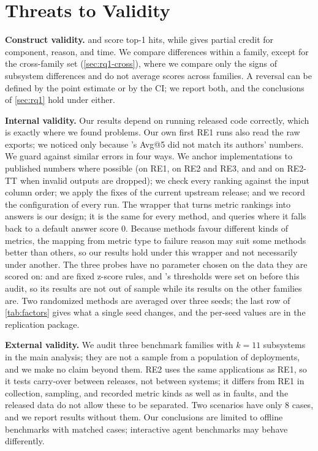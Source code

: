 \section{Threats to Validity}
\label{sec:threats}

\textbf{Construct validity.}
\rcaeval and \petshop score top-1 hits, while \openrca gives partial credit for component, reason, and time.
We compare differences within a family, except for the cross-family set (\cref{sec:rq1-cross}), where we compare only the signs of subsystem differences and do not average scores across families.
A reversal can be defined by the point estimate or by the CI; we report both, and the conclusions of \cref{sec:rq1} hold under either.

\textbf{Internal validity.}
Our results depend on running released code correctly, which is exactly where we found problems.
Our own first RE1 runs also read the raw exports; we noticed only because \baro's Avg@5 did not match its authors' numbers.
We guard against similar errors in four ways.
We anchor implementations to published numbers where possible (\baro on RE1, \simplerca on RE2 and RE3, and \tracerca and \microrank on RE2-TT when invalid outputs are dropped); we check every ranking against the input column order; we apply the fixes of the current upstream release; and we record the configuration of every run.
The \openrca wrapper that turns metric rankings into answers is our design; it is the same for every method, and queries where it falls back to a default answer score 0.
Because methods favour different kinds of metrics, the mapping from metric type to failure reason may suit some methods better than others, so our \openrca results hold under this wrapper and not necessarily under another.
The three probes have no parameter chosen on the data they are scored on: \maxz and \alertcount are fixed z-score rules, and \cdmin's thresholds were set on \openrca before this audit, so its \openrca results are not out of sample while its results on the other families are.
Two randomized methods are averaged over three seeds; the last row of \cref{tab:factors} gives what a single seed changes, and the per-seed values are in the replication package.

\textbf{External validity.}
We audit three benchmark families with $k=11$ subsystems in the main analysis; they are not a sample from a population of deployments, and we make no claim beyond them.
RE2 uses the same applications as RE1, so it tests carry-over between releases, not between systems; it differs from RE1 in collection, sampling, and recorded metric kinds as well as in faults, and the released data do not allow these to be separated.
Two \petshop scenarios have only 8 cases, and we report results without them.
Our conclusions are limited to offline benchmarks with matched cases; interactive agent benchmarks may behave differently.


